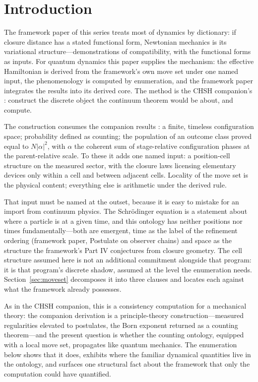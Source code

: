 \documentclass[11pt]{article}
\theoremstyle{definition}
\theoremstyle{remark}
\begin{document}
\begin{abstract}
\end{abstract}

\section{Introduction}\label{sec:intro}
The framework paper of this series \cite{TillittCR} treats most of dynamics by dictionary: if closure distance has a stated functional form, Newtonian mechanics is its variational structure---demonstrations of compatibility, with the functional forms as inputs. For quantum dynamics this paper supplies the mechanism: the effective Hamiltonian is derived from the framework's own move set under one named input, the phenomenology is computed by enumeration, and the framework paper integrates the results into its derived core. The method is the CHSH companion's \cite{TillittCHSH}: construct the discrete object the continuum theorem would be about, and compute.

The construction consumes the companion results \cite{TillittBorn}: a finite, timeless configuration space; probability defined as counting; the population of an outcome class proved equal to $N|\alpha|^2$, with $\alpha$ the coherent sum of stage-relative configuration phases at the parent-relative scale. To these it adds one named input: a position-cell structure on the measured sector, with the closure laws licensing elementary devices only within a cell and between adjacent cells. Locality of the move set is the physical content; everything else is arithmetic under the derived rule.

That input must be named at the outset, because it is easy to mistake for an import from continuum physics. The Schr\"odinger equation is a statement about where a particle is at a given time, and this ontology has neither positions nor times fundamentally---both are emergent, time as the label of the refinement ordering (framework paper, Postulate on observer chains) and space as the structure the framework's Part IV conjectures from closure geometry. The cell structure assumed here is not an additional commitment alongside that program: it is that program's discrete shadow, assumed at the level the enumeration needs. Section~\ref{sec:moveset} decomposes it into three clauses and locates each against what the framework already possesses.

As in the CHSH companion, this is a consistency computation for a mechanical theory: the companion derivation is a principle-theory construction---measured regularities elevated to postulates, the Born exponent returned as a counting theorem---and the present question is whether the counting ontology, equipped with a local move set, propagates like quantum mechanics. The enumeration below shows that it does, exhibits where the familiar dynamical quantities live in the ontology, and surfaces one structural fact about the framework that only the computation could have quantified.
\end{document}
